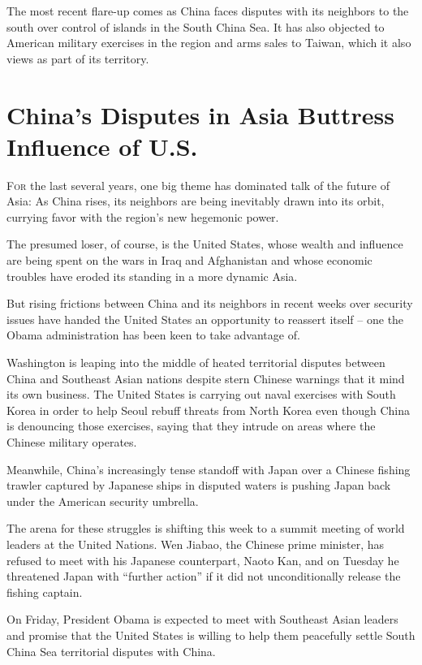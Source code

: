 ﻿\documentclass[12pt]{article}
\begin{document}
The most recent flare-up comes as China faces disputes with its neighbors to the south over control
of islands in the South China Sea. It has also objected to American military exercises in the region
and arms sales to Taiwan, which it also views as part of its territory.

\pagebreak
\section{China's Disputes in Asia Buttress Influence of U.S.}

\lettrine{F}{or} the last several years, one big theme has dominated talk
of the future of Asia: As China rises, its neighbors are being inevitably drawn into its orbit,
currying favor with the region's new hegemonic power.

The presumed loser, of course, is the United States, whose wealth and influence are being spent on
the wars in Iraq and Afghanistan and whose economic troubles have eroded its standing in a more
dynamic Asia.

But rising frictions between China and its neighbors in recent weeks over security issues have
handed the United States an opportunity to reassert itself -- one the Obama administration has been
keen to take advantage of.

Washington is leaping into the middle of heated territorial disputes between China and Southeast
Asian nations despite stern Chinese warnings that it mind its own business. The United States is
carrying out naval exercises with South Korea in order to help Seoul rebuff threats from North Korea
even though China is denouncing those exercises, saying that they intrude on areas where the Chinese
military operates.

Meanwhile, China's increasingly tense standoff with Japan over a Chinese fishing trawler captured by
Japanese ships in disputed waters is pushing Japan back under the American security umbrella.

The arena for these struggles is shifting this week to a summit meeting of world leaders at the
United Nations. Wen Jiabao, the Chinese prime minister, has refused to meet with his Japanese
counterpart, Naoto Kan, and on Tuesday he threatened Japan with ``further action'' if it did not
unconditionally release the fishing captain.

On Friday, President Obama is expected to meet with Southeast Asian leaders and promise that the
United States is willing to help them peacefully settle South China Sea territorial disputes with
China.
\end{document}
